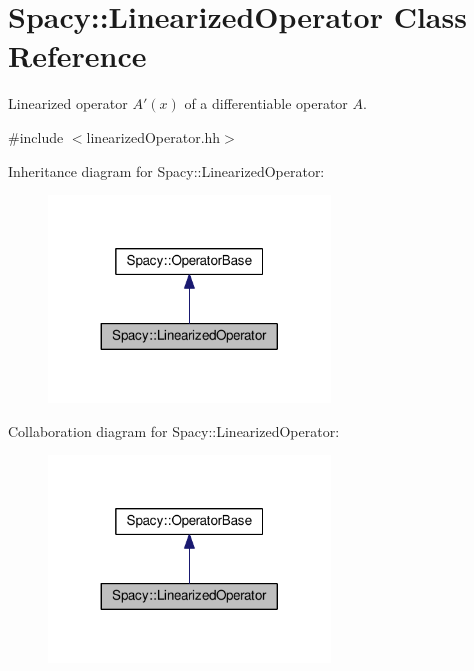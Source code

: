 \hypertarget{classSpacy_1_1LinearizedOperator}{}\section{Spacy\+:\+:Linearized\+Operator Class Reference}
\label{classSpacy_1_1LinearizedOperator}


Linearized operator $A'(x)$ of a differentiable operator $A$.  




{\ttfamily \#include $<$linearized\+Operator.\+hh$>$}



Inheritance diagram for Spacy\+:\+:Linearized\+Operator\+:\nopagebreak
\begin{figure}[H]
\begin{center}
\leavevmode
\includegraphics[width=212pt]{classSpacy_1_1LinearizedOperator__inherit__graph}
\end{center}
\end{figure}


Collaboration diagram for Spacy\+:\+:Linearized\+Operator\+:\nopagebreak
\begin{figure}[H]
\begin{center}
\leavevmode
\includegraphics[width=212pt]{classSpacy_1_1LinearizedOperator__coll__graph}
\end{center}
\end{figure}
